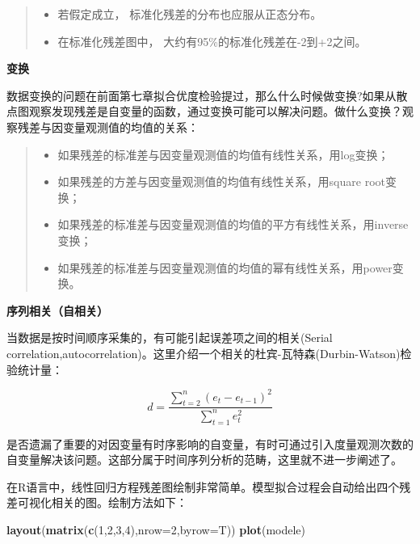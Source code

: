 \documentclass[]{ctexbook}
\newenvironment{Shaded}{\begin{snugshade}}{\end{snugshade}}
\newcommand{\DataTypeTok}[1]{\textcolor[rgb]{0.13,0.29,0.53}{#1}}
\newcommand{\DecValTok}[1]{\textcolor[rgb]{0.00,0.00,0.81}{#1}}
\newcommand{\KeywordTok}[1]{\textcolor[rgb]{0.13,0.29,0.53}{\textbf{#1}}}
\newcommand{\NormalTok}[1]{#1}
\providecommand{\tightlist}{%
  \setlength{\itemsep}{0pt}\setlength{\parskip}{0pt}}
\begin{document}
\begin{quote}
\begin{itemize}
\tightlist
\item
  若假定成立， 标准化残差的分布也应服从正态分布。
\item
  在标准化残差图中， 大约有95\%的标准化残差在-2到+2之间。
\end{itemize}
\end{quote}

\textbf{变换}

数据变换的问题在前面第七章拟合优度检验提过，那么什么时候做变换?如果从散点图观察发现残差是自变量的函数，通过变换可能可以解决问题。做什么变换？观察残差与因变量观测值的均值的关系：

\begin{quote}
\begin{itemize}
\tightlist
\item
  如果残差的标准差与因变量观测值的均值有线性关系，用log变换；
\item
  如果残差的方差与因变量观测值的均值有线性关系，用square root变换；
\item
  如果残差的标准差与因变量观测值的均值的平方有线性关系，用inverse变换；
\item
  如果残差的标准差与因变量观测值的均值的幂有线性关系，用power变换。
\end{itemize}
\end{quote}

\textbf{序列相关（自相关）}

当数据是按时间顺序采集的，有可能引起误差项之间的相关(Serial correlation,autocorrelation)。这里介绍一个相关的杜宾-瓦特森(Durbin-Watson)检验统计量：

\[d=\frac{\sum_{t=2}^n(e_t-e_{t-1})^2}{\sum_{t=1}^ne_t^2}\]

是否遗漏了重要的对因变量有时序影响的自变量，有时可通过引入度量观测次数的自变量解决该问题。这部分属于时间序列分析的范畴，这里就不进一步阐述了。

在R语言中，线性回归方程残差图绘制非常简单。模型拟合过程会自动给出四个残差可视化相关的图。绘制方法如下：

\begin{Shaded}
\begin{Highlighting}[]
\KeywordTok{layout}\NormalTok{(}\KeywordTok{matrix}\NormalTok{(}\KeywordTok{c}\NormalTok{(}\DecValTok{1}\NormalTok{,}\DecValTok{2}\NormalTok{,}\DecValTok{3}\NormalTok{,}\DecValTok{4}\NormalTok{),}\DataTypeTok{nrow=}\DecValTok{2}\NormalTok{,}\DataTypeTok{byrow=}\NormalTok{T))}
\KeywordTok{plot}\NormalTok{(modele)}
\end{Highlighting}
\end{Shaded}
\end{document}
